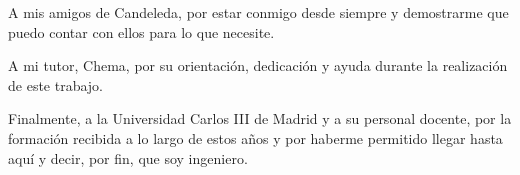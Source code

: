 \documentclass[12pt]{report} %
\begin{document}
		A mis amigos de Candeleda, por estar conmigo desde siempre y demostrarme que puedo contar con ellos para lo que necesite.
		
		A mi tutor, Chema, por su orientación, dedicación y ayuda durante la realización de este trabajo.
		
		Finalmente, a la Universidad Carlos III de Madrid y a su personal docente, por la formación recibida a lo largo de estos años y por haberme permitido llegar hasta aquí y decir, por fin, que soy ingeniero.
		
	\vfill
	
	\newpage %
	\thispagestyle{empty}
	\mbox{}
	


\tableofcontents
\thispagestyle{fancy}

\newpage %
\thispagestyle{empty}
\mbox{}

\listoffigures
\thispagestyle{fancy}

\newpage %
\thispagestyle{empty}
\mbox{}

\listoftables
\thispagestyle{fancy}

\newpage %
\thispagestyle{empty}
\mbox{}


\clearpage


\newpage %
\thispagestyle{empty}
\mbox{}
\clearpage














\nocite{*} %

\clearpage
{}
\printbibliography





\end{document}
